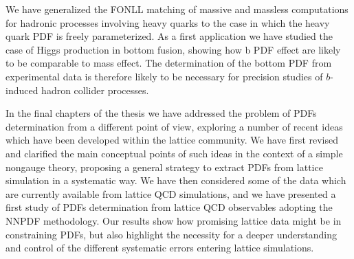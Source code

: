 %
We have generalized the FONLL matching of massive and massless computations for hadronic processes
involving heavy quarks to the case in which the heavy quark PDF is freely parameterized. 
As a first application we have studied the case of Higgs production in bottom fusion, showing how b PDF effect are likely
to be comparable to mass effect. The determination of the bottom PDF from experimental data is therefore likely to be 
necessary for precision studies of $b$-induced hadron collider processes.

%
In the final chapters of the thesis we have addressed the problem of PDFs determination from a different point of view,
exploring a number of recent ideas which have been developed within the lattice community.
We have first revised and clarified the main conceptual points of such ideas in the context of a simple nongauge theory,
proposing a general strategy to extract PDFs from lattice simulation in a systematic way.
We have then considered some of the data which are currently available from lattice QCD simulations, and we have presented
a first study of PDFs determination from lattice QCD observables adopting the NNPDF methodology.
Our results show how promising lattice data might be in constraining PDFs, but also highlight the necessity for a deeper
understanding and control of the different systematic errors entering lattice simulations.
